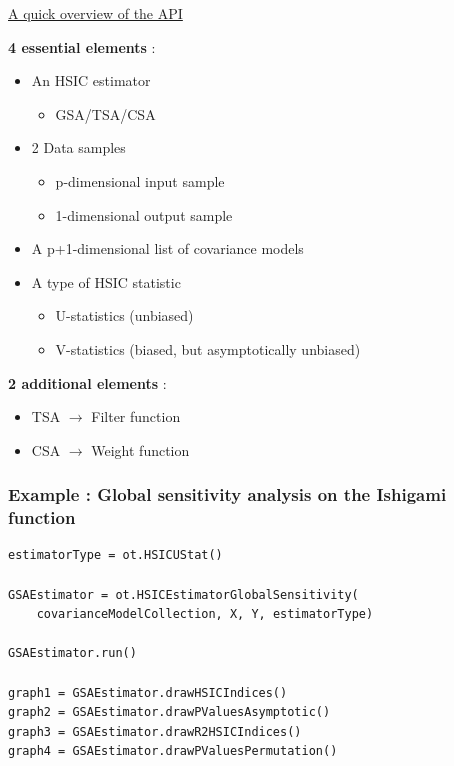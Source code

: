 \documentclass[aspectratio=169]{beamer}
\begin{document}
\begin{frame}
\begin{small}

\underline{A quick overview of the API}

\begin{minipage}[t]{0.6\textwidth}

\vspace{6pt}

\textbf{4 essential elements} : 
\begin{itemize}
\item An HSIC estimator
\begin{itemize}
\item GSA/TSA/CSA
\end{itemize}
\item 2 Data samples
\begin{itemize}
\item p-dimensional input sample
\item 1-dimensional output sample
\end{itemize}
\item A p+1-dimensional list of covariance models
\item A type of HSIC statistic
\begin{itemize}
\item U-statistics (unbiased)
\item V-statistics (biased, but asymptotically unbiased)
\end{itemize}
\end{itemize}
\end{minipage}%
\begin{minipage}[t]{0.4\textwidth}

\vspace{6pt}

\textbf{2 additional elements} : 
\begin{itemize}
\item TSA $\rightarrow$ Filter function
\item CSA $\rightarrow$ Weight function
\end{itemize}
\end{minipage}%


\end{small}
\end{frame}

\begin{frame}[containsverbatim]	
\frametitle{Example : Global sensitivity analysis on the Ishigami function}
\begin{small}

\begin{lstlisting}
estimatorType = ot.HSICUStat()

GSAEstimator = ot.HSICEstimatorGlobalSensitivity(
    covarianceModelCollection, X, Y, estimatorType)
    
GSAEstimator.run()

graph1 = GSAEstimator.drawHSICIndices()
graph2 = GSAEstimator.drawPValuesAsymptotic()
graph3 = GSAEstimator.drawR2HSICIndices()
graph4 = GSAEstimator.drawPValuesPermutation()
\end{lstlisting}

\end{small}
\end{frame}
\end{document}
